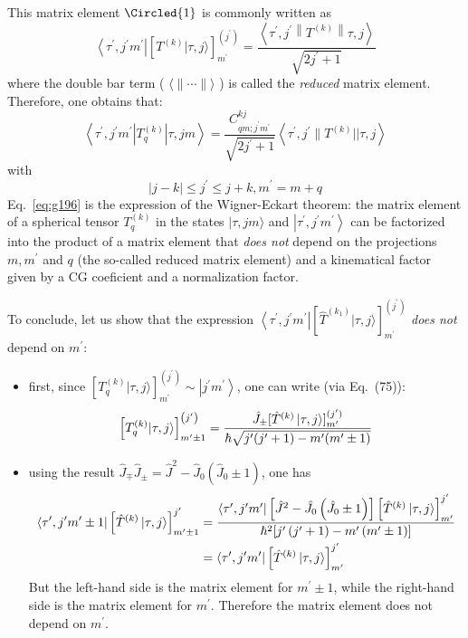 \documentclass[12pt]{article}
\newcommand{\be}{\begin{equation}}
\newcommand{\ee}{\end{equation}}
\begin{document}
This matrix element $\Circled{1}$ is commonly written as
\be
\left\langle\tau^{\prime}, j^{\prime} m^{\prime}\right|\left[T^{(k)}|\tau, j\rangle\right]_{m^{\prime}}^{\left(j^{\prime}\right)}=\frac{\left\langle\tau^{\prime}, j^{\prime}\left\|T^{(k)}\right\| \tau, j\right\rangle}{\sqrt{2 j^{\prime}+1}}
\ee
where the double bar term ( $\langle\|\cdots\|\rangle$ ) is called the \emph{reduced} matrix element.
Therefore, one obtains that:
\be
\left\langle\tau^{\prime}, j^{\prime} m^{\prime}\left|T_{q}^{(k)}\right| \tau, j m\right\rangle=
\frac{C_{q m ; j^{\prime} m^{\prime}}^{k j} }{\sqrt{2 j^{\prime}+1}}\left\langle\tau^{\prime}, j^{\prime} \| T^{(k)}|| \tau, j\right\rangle
\label{eq:g196}
\ee
with
\be
|j-k| \leqslant j^\prime \leqslant j+k, m^\prime=m+q
\ee
Eq.~\eqref{eq:g196} is the expression of the Wigner-Eckart theorem:
the matrix element of a spherical tensor \(T_q^{(k)}\) in
the states \(|\tau, j m\rangle\) and \(\left|\tau^{\prime}, j^{\prime} m^{\prime}\right\rangle\) can be factorized
into the product of a matrix element that \emph{does not}
depend on the projections \(m, m^{\prime}\) and \(q\) (the so-called
reduced matrix element) and a kinematical factor
given by a CG coeficient and a normalization
factor.

To conclude, let us show that the expression \(\left\langle\tau^{\prime}, j^{\prime} m^{\prime}\right|\left[\hat{T}^{\left(k_{1}\right)}|\tau, j\rangle\right]_{m^{\prime}}^{\left(j^{\prime}\right)}\)
\emph{does not} depend on \(m^{\prime}\):
\begin{itemize}
\item first, since \(\left[T_{q}^{(k)}|\tau, j\rangle\right]_{m^{\prime}}^{\left(j^{\prime}\right)} \sim\left|j^{\prime} m^{\prime}\right\rangle\), one can write (via Eq.~(75)):
\be
\left[T_{q}^{(k)}|\tau, j\rangle\right]_{m^{\prime}\pm1}^{\left(j^{\prime}\right)}
=
\frac{\hat{J}_{\pm}[\hat{T}^{(k)}\ket{\tau,j}]_{m^\prime}^{(j^\prime)}}
{\hbar\sqrt{j^\prime(j^\prime+1)-m^\prime(m^\prime\pm1)}}
\ee

\item using the result \(\hat{J}_{\mp} \hat{J}_{\pm}=\hat{J}^{2}-\hat{J}_{0}\left(\hat{J}_{0} \pm 1\right)\), one has
\[
\begin{aligned}
\bra{\tau^\prime,j^\prime m^\prime\pm1} \left[\hat{T}^{(k)}\ket{\tau,j}\right]^{j^\prime}_{m^\prime\pm1}
&=\frac{\bra{\tau^\prime,j^\prime m^\prime} \left[\hat{J}^{2}-\hat{J}_{0}\left(\hat{J}_{0} \pm 1\right)\right] \left[\hat{T}^{(k)}\ket{\tau,j}\right]^{j^\prime}_{m^\prime}}%
{\hbar^2[j^{\prime}\left(j^{\prime}+1\right)-m^{\prime}\left(m^{\prime}\pm1\right)]}\\
&=\bra{\tau^\prime,j^\prime m^\prime}\left[\hat{T}^{(k)}\ket{\tau,j}\right]^{j^\prime}_{m^\prime}
\end{aligned}
\]
But the left-hand side is the matrix element for $m^\prime \pm 1$, 
while the right-hand side is the matrix element for $m^\prime$.
Therefore the matrix element does not depend on $m^\prime$.
\end{itemize}
\end{document}
